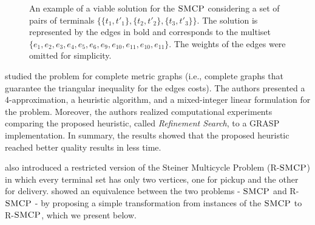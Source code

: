 \begin{figure}[H]
    \centering
{}
    \caption{An example of a viable solution for the \(\textsc{SMCP}\) considering a set of pairs of terminals \(\{\{t_1, t'_1\}, \{t_2, t'_2\}, \{t_3, t' _3\}\}\). The solution is represented by the edges in bold and corresponds to the multiset \(\{e_1, e_2, e_3, e_4, e_5, e_6, e_9, e_{10}, e_{11}, e_{10}, e_{11}\}\). The weights of the edges were omitted for simplicity.}
    \label{fig:exem_multicycle}
\end{figure}

\cite{Pereira2018TheSM} studied the problem for complete metric graphs (i.e., complete graphs that guarantee the triangular inequality for the edges costs). The authors presented a 4-approximation, a heuristic algorithm, and a mixed-integer linear formulation for the problem.
Moreover, the authors realized computational experiments comparing the proposed heuristic, called \textit{Refinement Search}, to a GRASP implementation. In summary, the results showed that the proposed heuristic reached better quality results in less time.

\citeauthor{Pereira2018TheSM} also introduced a restricted version of the Steiner Multicycle Problem (R-\(\textsc{SMCP}\)) in which every terminal set has only two vertices, one for pickup and the other for delivery. \cite{LINTZMAYER2020134} showed an equivalence between the two problems - \(\textsc{SMCP}\) and R-\(\textsc{SMCP}\) - by proposing a simple transformation from instances of the \(\textsc{SMCP}\) to R-\(\textsc{SMCP}\), which we present below. 

